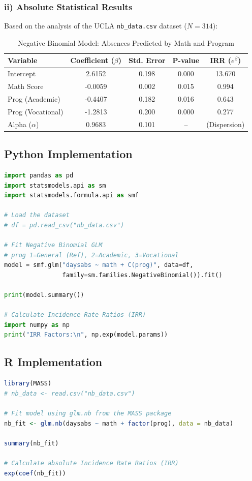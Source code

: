 \documentclass[12pt]{article}
\begin{document}
\subsubsection{ii) Absolute Statistical Results}
Based on the analysis of the UCLA \texttt{nb\_data.csv} dataset ($N=314$):

\begin{table}[h!]
\centering
\caption{Negative Binomial Model: Absences Predicted by Math and Program}
\begin{tabular}{@{}lcccc@{}}
\toprule
\textbf{Variable} & Coefficient ($\beta$) & Std. Error & P-value & \textbf{IRR} ($e^\beta$) \\ \midrule
Intercept & 2.6152 & 0.198 & 0.000 & 13.670 \\
Math Score & -0.0059 & 0.002 & 0.015 & 0.994 \\
Prog (Academic) & -0.4407 & 0.182 & 0.016 & 0.643 \\
Prog (Vocational) & -1.2813 & 0.200 & 0.000 & 0.277 \\ \midrule
Alpha ($\alpha$) & 0.9683 & 0.101 & -- & (Dispersion) \\ \bottomrule
\end{tabular}
\end{table}

\subsection{Python Implementation}
\begin{lstlisting}[language=Python, caption=Python Negative Binomial Regression]
import pandas as pd
import statsmodels.api as sm
import statsmodels.formula.api as smf

# Load the dataset
# df = pd.read_csv("nb_data.csv")

# Fit Negative Binomial GLM
# prog 1=General (Ref), 2=Academic, 3=Vocational
model = smf.glm("daysabs ~ math + C(prog)", data=df, 
                family=sm.families.NegativeBinomial()).fit()

print(model.summary())

# Calculate Incidence Rate Ratios (IRR)
import numpy as np
print("IRR Factors:\n", np.exp(model.params))
\end{lstlisting}

\subsection{R Implementation}
\begin{lstlisting}[language=R, caption=R Negative Binomial Regression]
library(MASS)
# nb_data <- read.csv("nb_data.csv")

# Fit model using glm.nb from the MASS package
nb_fit <- glm.nb(daysabs ~ math + factor(prog), data = nb_data)

summary(nb_fit)

# Calculate absolute Incidence Rate Ratios (IRR)
exp(coef(nb_fit))
\end{lstlisting}
\end{document}
